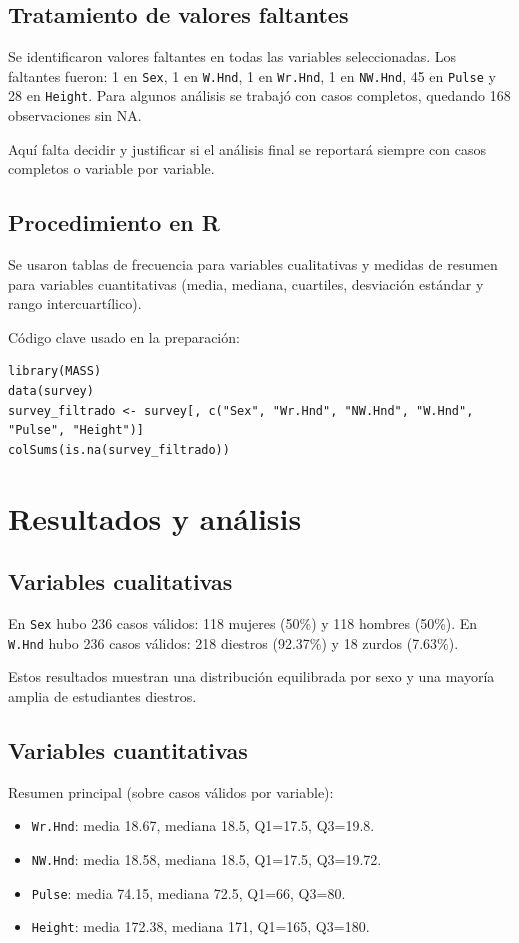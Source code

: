 \documentclass[11pt]{article}
\begin{document}
\subsection{Tratamiento de valores faltantes}
Se identificaron valores faltantes en todas las variables seleccionadas. Los faltantes fueron: 1 en \texttt{Sex}, 1 en \texttt{W.Hnd}, 1 en \texttt{Wr.Hnd}, 1 en \texttt{NW.Hnd}, 45 en \texttt{Pulse} y 28 en \texttt{Height}. Para algunos análisis se trabajó con casos completos, quedando 168 observaciones sin NA.

Aquí falta decidir y justificar si el análisis final se reportará siempre con casos completos o variable por variable.

\subsection{Procedimiento en R}
Se usaron tablas de frecuencia para variables cualitativas y medidas de resumen para variables cuantitativas (media, mediana, cuartiles, desviación estándar y rango intercuartílico).

Código clave usado en la preparación:
\begin{verbatim}
library(MASS)
data(survey)
survey_filtrado <- survey[, c("Sex", "Wr.Hnd", "NW.Hnd", "W.Hnd", "Pulse", "Height")]
colSums(is.na(survey_filtrado))
\end{verbatim}

\section{Resultados y análisis}
\subsection{Variables cualitativas}
En \texttt{Sex} hubo 236 casos válidos: 118 mujeres (50\%) y 118 hombres (50\%).
En \texttt{W.Hnd} hubo 236 casos válidos: 218 diestros (92.37\%) y 18 zurdos (7.63\%).

Estos resultados muestran una distribución equilibrada por sexo y una mayoría amplia de estudiantes diestros.

\subsection{Variables cuantitativas}
Resumen principal (sobre casos válidos por variable):
\begin{itemize}
  \item \texttt{Wr.Hnd}: media 18.67, mediana 18.5, Q1=17.5, Q3=19.8.
  \item \texttt{NW.Hnd}: media 18.58, mediana 18.5, Q1=17.5, Q3=19.72.
  \item \texttt{Pulse}: media 74.15, mediana 72.5, Q1=66, Q3=80.
  \item \texttt{Height}: media 172.38, mediana 171, Q1=165, Q3=180.
\end{itemize}
\end{document}

